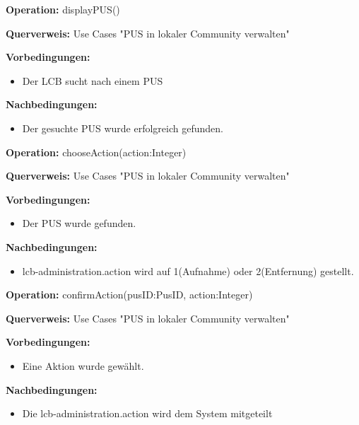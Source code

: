 \documentclass[a4paper,12pt]{article}
\begin{document}
	\begin{contractbox}
	\textbf{Operation:} displayPUS()
	
	\textbf{Querverweis:} Use Cases "PUS in lokaler Community verwalten"
	
	\textbf{Vorbedingungen:}
	\begin{itemize}[noitemsep]
		\item Der LCB sucht nach einem PUS
	\end{itemize}
	
	\textbf{Nachbedingungen:}
	\begin{itemize}[noitemsep] 
		\item Der gesuchte PUS wurde erfolgreich gefunden.
	\end{itemize}
\end{contractbox}
	
	\begin{contractbox}
		\textbf{Operation:} chooseAction(action:Integer)
		
		\textbf{Querverweis:} Use Cases "PUS in lokaler Community verwalten"
		
		\textbf{Vorbedingungen:}
		\begin{itemize}[noitemsep]
			\item Der PUS wurde gefunden.
		\end{itemize}
		
		\textbf{Nachbedingungen:}
		\begin{itemize}[noitemsep]
			\item lcb-administration.action wird auf 1(Aufnahme) oder 2(Entfernung) gestellt.
		\end{itemize}
	\end{contractbox}
	
	\begin{contractbox}
		\textbf{Operation:} confirmAction(pusID:PusID, action:Integer)
		
		\textbf{Querverweis:} Use Cases "PUS in lokaler Community verwalten"
		
		\textbf{Vorbedingungen:}
		\begin{itemize}[noitemsep]
			\item Eine Aktion wurde gewählt.
		\end{itemize}
		
		\textbf{Nachbedingungen:}
		\begin{itemize}[noitemsep]
			\item Die lcb-administration.action wird dem System mitgeteilt
		\end{itemize}
	\end{contractbox}
	
\end{document}

